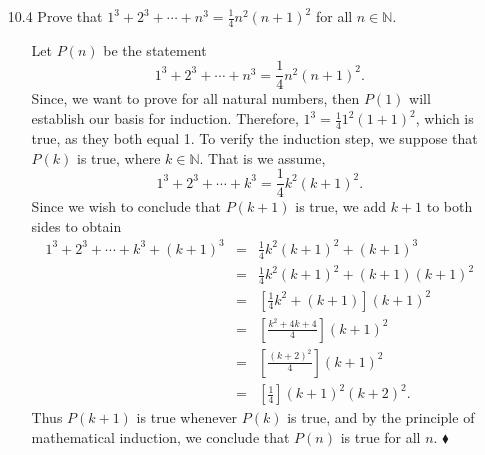 \documentclass[12pt]{article}
\begin{document}
\begin{enumerate}
\item[10.4] Prove that $1^3 + 2^3 + \cdots + n^3 = \frac{1}{4}n^2(n + 1)^2$ for all $n \in \mathbb{N}$.
\begin{enumerate}
\item[] Let $P(n)$ be the statement \[
1^3 + 2^3 + \cdots + n^3 = \frac{1}{4} n^2(n + 1)^2.
\]
Since, we want to prove for all natural numbers, then $P(1)$ will establish our
basis for induction. Therefore, $1^3 = \frac{1}{4} 1^2(1 + 1)^2$, which is true, as they both
equal 1. To verify the induction step, we suppose that $P(k)$ is true, where $k \in \mathbb{N}$.
That is we assume, \[
1^3 + 2^3 + \cdots + k^3 = \frac{1}{4} k^2(k + 1)^2.
\]
Since we wish to conclude that $P(k + 1)$ is true, we add $k + 1$ to both sides to obtain
\begin{eqnarray*}
1^3 + 2^3 + \cdots + k^3 + (k + 1)^3 &=& \frac{1}{4} k^2(k + 1)^2 + (k + 1)^3 \\
&=& \frac{1}{4} k^2(k + 1)^2 + (k + 1)(k + 1)^2 \\
&=& [\frac{1}{4} k^2 + (k + 1)](k + 1)^2 \\
&=& [\frac{k^2 + 4k + 4}{4}](k + 1)^2 \\
&=& [\frac{(k + 2)^2}{4}](k + 1)^2 \\
&=& [\frac{1}{4}](k + 1)^2(k + 2)^2.
\end{eqnarray*}
Thus $P(k + 1)$ is true whenever $P(k)$ is true, and by the principle of 
mathematical induction, we conclude that $P(n)$ is true for all $n$. $\blacklozenge$
\end{enumerate}


\end{enumerate}
\end{document}
